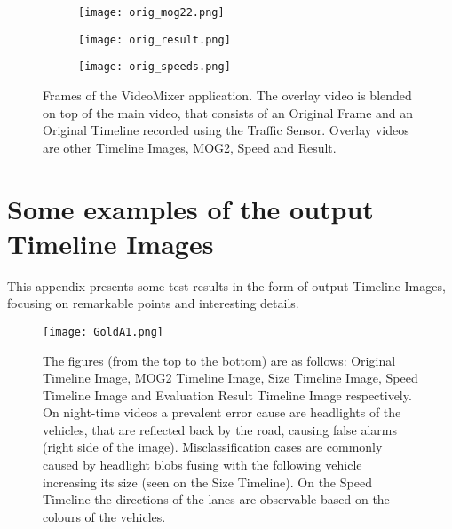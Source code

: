 \begin{figure}[!h]
	\centering
	\begin{subfigure}[t]{0.6\textwidth}
		\texttt{[image: orig\_mog22.png]}
	\end{subfigure}
	\hfill
	\begin{subfigure}[t]{0.6\textwidth}
		\texttt{[image: orig\_result.png]}
	\end{subfigure}
	\hfill
	\begin{subfigure}[t]{0.6\textwidth}
		\texttt{[image: orig\_speeds.png]}
	\end{subfigure}

	\caption{Frames of the VideoMixer application. The overlay video is blended on top of the main video, that consists of an Original Frame and an Original Timeline recorded using the Traffic Sensor. Overlay videos are other Timeline Images, MOG2, Speed and Result.\label{fig:video_mixer_frames}}
\end{figure}

\clearpage\section{Some examples of the output Timeline Images}\label{app:TIs}
This appendix presents some test results in the form of output Timeline Images, focusing on remarkable points and interesting details.

\centering
\begin{figure}[h!]
	\centering
	\texttt{[image: GoldA1.png]}
	\caption[Some output Timelines of the GoldA1 test video]{The figures (from the top to the bottom) are as follows: Original Timeline Image, MOG2 Timeline Image, Size Timeline Image, Speed Timeline Image and Evaluation Result Timeline Image respectively. On night-time videos a prevalent error cause are headlights of the vehicles, that are reflected back by the road, causing false alarms (right side of the image). Misclassification cases are commonly caused by headlight blobs fusing with the following vehicle increasing its size (seen on the Size Timeline). On the Speed Timeline the directions of the lanes are observable based on the colours of the vehicles. \label{fig:GoldA1}}
\end{figure}

